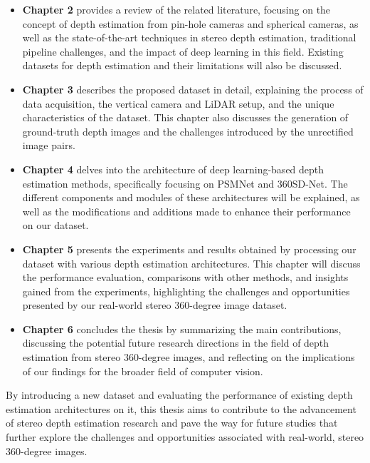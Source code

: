 \documentclass[english, LaM, oneside]{sapthesis}%
\begin{document}
\begin{itemize}
    \item \textbf{Chapter 2} provides a review of the related literature, focusing on the concept of depth estimation from pin-hole cameras and spherical cameras, as well as the state-of-the-art techniques in stereo depth estimation, traditional pipeline challenges, and the impact of deep learning in this field. Existing datasets for depth estimation and their limitations will also be discussed.
\item \textbf{Chapter 3} describes the proposed dataset in detail, explaining the process of data acquisition, the vertical camera and LiDAR setup, and the unique characteristics of the dataset. This chapter also discusses the generation of ground-truth depth images and the challenges introduced by the unrectified image pairs.
    \item \textbf{Chapter 4} delves into the architecture of deep learning-based depth estimation methods, specifically focusing on PSMNet and 360SD-Net. The different components and modules of these architectures will be explained, as well as the modifications and additions made to enhance their performance on our dataset.
    \item \textbf{Chapter 5} presents the experiments and results obtained by processing our dataset with various depth estimation architectures. This chapter will discuss the performance evaluation, comparisons with other methods, and insights gained from the experiments, highlighting the challenges and opportunities presented by our real-world stereo 360-degree image dataset.
    \item \textbf{Chapter 6} concludes the thesis by summarizing the main contributions, discussing the potential future research directions in the field of depth estimation from stereo 360-degree images, and reflecting on the implications of our findings for the broader field of computer vision.
\end{itemize}

By introducing a new dataset and evaluating the performance of existing depth estimation architectures on it, this thesis aims to contribute to the advancement of stereo depth estimation research and pave the way for future studies that further explore the challenges and opportunities associated with real-world, stereo 360-degree images.



\end{document}
